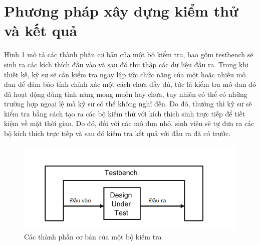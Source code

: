 \section{Phương pháp xây dựng kiểm thử và kết quả}
Hình \ref{fig:testComponents} mô tả các thành phần cơ bản của một bộ kiểm tra, bao gồm testbench sẽ sinh ra các kích thích đầu vào và sau đó thu thập các dữ liệu đầu ra.
Trong khi thiết kế, kỹ sư sẽ cần kiểm tra ngay lập tức chức năng của một hoặc nhiều mô đun để đảm bảo tính chính xác một cách chưa đầy đủ, tức là kiểm tra mô đun đó đã hoạt động đúng tính năng mong muốn hay chưa, tuy nhiên có thể có những trường hợp ngoại lệ mà kỹ sư có thể không nghĩ đến. Do đó, thường thì kỹ sư sẽ kiểm tra bằng cách tạo ra các bộ kiểm thử với kích thích sinh trực tiếp để tiết kiệm về mặt thời gian. Do đó, đối với các mô đun nhỏ, sinh viên sẽ tự đưa ra các bộ kích thích trực tiếp và sau đó kiểm tra kết quả với đầu ra đã có trước. 

\begin{figure}[!ht]
	\centering
	\includegraphics[width=\linewidth]{figures/testComponents.png}
	\caption{Các thành phần cơ bản của một bộ kiểm tra}
	\label{fig:testComponents}
\end{figure}

